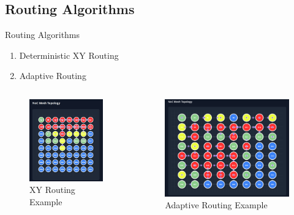 \documentclass{beamer}
\begin{document}
\subsection{Routing Algorithms}
\begin{frame}{Routing Algorithms}
	\begin{enumerate}
		\item Deterministic XY Routing
		\item Adaptive Routing
	\end{enumerate}
	\begin{columns}[b]
		\begin{column}{0.5\textwidth}
			\begin{figure}
				\centering
				\includegraphics[width=0.6\linewidth]{images/xy-routing.jpg}
				\caption{XY Routing Example}
			\end{figure}
		\end{column}
		\begin{column}{0.5\textwidth}
			\begin{figure}
				\centering
				\includegraphics[width=0.8\linewidth]{images/adaptive-routing.png}
				\caption{Adaptive Routing Example}
			\end{figure}
		\end{column}
	\end{columns}
\end{frame}
\end{document}
